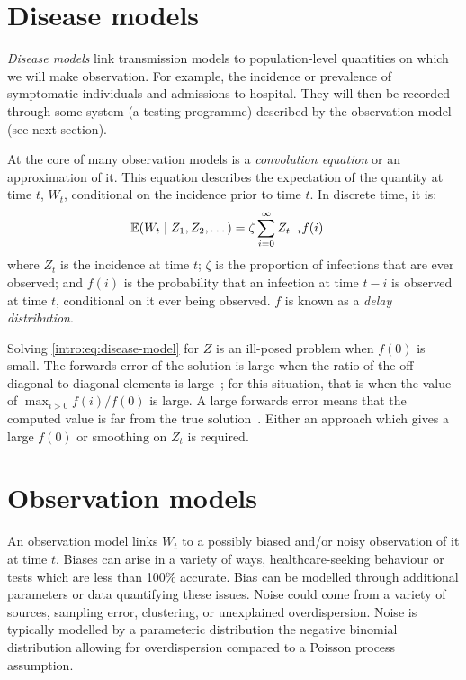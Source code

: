 \documentclass[thesis.tex]{subfiles}
\begin{document}
\section{Disease models}

\emph{Disease models} link transmission models to population-level quantities on which we will make observation.
For example, the incidence or prevalence of symptomatic individuals and admissions to hospital.
They will then be recorded through some system (\eg a testing programme) described by the observation model (see next section).


At the core of many observation models is a \emph{convolution equation} or an approximation of it.
This equation describes the expectation of the quantity at time $t$, $W_t$, conditional on the incidence prior to time $t$.
In discrete time, it is:
\begin{align}
    \operatorname{\mathbb{E}}(W_t \mid Z_1, Z_2, \dots) &= \zeta \sum_{i=0}^\infty Z_{t-i} f(i)
    \label{intro:eq:disease-model}
\end{align}
where $Z_t$ is the incidence at time $t$; $\zeta$ is the proportion of infections that are ever observed; and $f(i)$ is the probability that an infection at time $t-i$ is observed at time $t$, conditional on it ever being observed.
$f$ is known as a \emph{delay distribution}.

Solving \cref{intro:eq:disease-model} for $Z$ is an ill-posed problem when $f(0)$ is small.
The forwards error of the solution is large when the ratio of the off-diagonal to diagonal elements is large~\autocite[chapter 8.2]{highamAccuracy}; for this situation, that is when the value of $\max_{i > 0} f(i) / f(0)$ is large.
A large forwards error means that the computed value is far from the true solution~\autocite[6--9]{highamAccuracy}.
Either an approach which gives a large $f(0)$ or smoothing on $Z_t$ is required.

\section{Observation models}

An observation model links $W_t$ to a possibly biased and/or noisy observation of it at time $t$.
Biases can arise in a variety of ways, \eg healthcare-seeking behaviour or tests which are less than 100\% accurate.
Bias can be modelled through additional parameters or data quantifying these issues.
Noise could come from a variety of sources, \eg sampling error, clustering, or unexplained overdispersion.
Noise is typically modelled by a parameteric distribution \eg the negative binomial distribution allowing for overdispersion compared to a Poisson process assumption.
\end{document}
